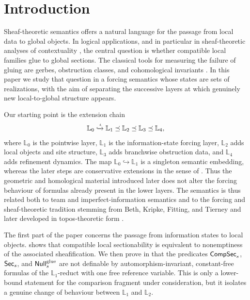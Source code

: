 \section{Introduction}\label{sec:introduction}

Sheaf-theoretic semantics offers a natural language for the passage from local data to global objects. In logical applications, and in particular in sheaf-theoretic analyses of contextuality \cite{AbramskyBrandenburger2011,AbramskyMansfieldSoaresBarbosa2012,AbramskyBarbosaKishidaLalMansfield2015,Caru2017,Caru2018,Montanhano2021}, the central question is whether compatible local families glue to global sections. The classical tools for measuring the failure of gluing are gerbes, obstruction classes, and cohomological invariants \cite{Giraud1971,Breen2006,Hatcher2002}. In this paper we study that question in a forcing semantics whose states are sets of realizations, with the aim of separating the successive layers at which genuinely new local-to-global structure appears.

Our starting point is the extension chain
\[
\mathbb{L}_0 \xhookrightarrow{\iota} \mathbb{L}_1 \preceq \mathbb{L}_2 \preceq \mathbb{L}_3 \preceq \mathbb{L}_4,
\]
where $\mathbb{L}_0$ is the pointwise layer, $\mathbb{L}_1$ is the information-state forcing layer, $\mathbb{L}_2$ adds local objects and site structure, $\mathbb{L}_3$ adds branchwise obstruction data, and $\mathbb{L}_4$ adds refinement dynamics. The map $\mathbb{L}_0\hookrightarrow\mathbb{L}_1$ is a singleton semantic embedding, whereas the later steps are conservative extensions in the sense of . Thus the geometric and homological material introduced later does not alter the forcing behaviour of formulas already present in the lower layers.
The semantics is thus related both to team and imperfect-information semantics \cite{Hodges1997,Vaananen2007,AbramskyPuljujarviVaananen2025} and to the forcing and sheaf-theoretic tradition stemming from Beth, Kripke, Fitting, and Tierney and later developed in topos-theoretic form \cite{Beth1956,Kripke1965,Fitting1969,Tierney1972,Goldblatt2006,Johnstone2002}.

The first part of the paper concerns the passage from information states to local objects.  shows that compatible local sectionability is equivalent to nonemptiness of the associated sheafification. We then prove in  that the predicates $\mathsf{CompSec}_s$, $\mathsf{Sec}_s$, and $\mathsf{Null}^{\mathrm{glue}}_s$ are not definable by automorphism-invariant, constant-free formulas of the $\mathbb{L}_1$-reduct with one free reference variable. This is only a lower-bound statement for the comparison fragment under consideration, but it isolates a genuine change of behaviour between $\mathbb L_1$ and $\mathbb L_2$.

